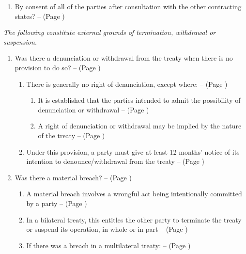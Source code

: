 \begin{enumerate}
\begin{enumerate}
\begin{enumerate}
            \item By consent of all of the parties after consultation with the other contracting states? --  (Page \pageref{VCLT Art 57})
        \end{enumerate}
    \end{enumerate}
    \textit{The following constitute external grounds of termination, withdrawal or suspension.}
    \begin{enumerate}[resume]
        \item Was there a denunciation or withdrawal from the treaty when there is no provision to do so? --  (Page \pageref{VCLT Art 56})
        \begin{enumerate}
            \item There is generally no right of denunciation, except where: --  (Page \pageref{VCLT Art 56})
            \begin{enumerate}
                \item It is established that the parties intended to admit the possibility of denunciation or withdrawal --  (Page \pageref{VCLT Art 56})
                \item A right of denunciation or withdrawal may be implied by the nature of the treaty --  (Page \pageref{VCLT Art 56})
            \end{enumerate}
            \item Under this provision, a party must give at least 12 months' notice of its intention to denounce/withdrawal from the treaty --  (Page \pageref{VCLT Art 56})
        \end{enumerate}
        \item Was there a material breach? --  (Page \pageref{VCLT Art 60})
        \begin{enumerate}
            \item A material breach involves a wrongful act being intentionally committed by a party --  (Page \pageref{case:[1997] ICJ Rep 7})
            \item In a bilateral treaty, this entitles the other party to terminate the treaty or suspend its operation, in whole or in part --  (Page \pageref{VCLT Art 60})
            \item If there was a breach in a multilateral treaty: --  (Page \pageref{VCLT Art 60})

\end{enumerate}
\end{enumerate}
\end{enumerate}
